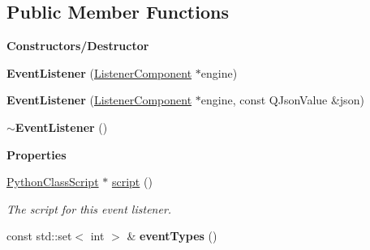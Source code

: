 \subsection*{Public Member Functions}
\begin{Indent}\textbf{ Constructors/\+Destructor}\par
\begin{DoxyCompactItemize}
\item 
\mbox{\label{classrev_1_1_event_listener_a8f026331faa8d20abad8afb712e62879}} 
{\bfseries Event\+Listener} (\mbox{\hyperlink{classrev_1_1_listener_component}{Listener\+Component}} $\ast$engine)
\item 
\mbox{\label{classrev_1_1_event_listener_ad98d4d0b094eeb0f6d3ff5ec29ba0b31}} 
{\bfseries Event\+Listener} (\mbox{\hyperlink{classrev_1_1_listener_component}{Listener\+Component}} $\ast$engine, const Q\+Json\+Value \&json)
\item 
\mbox{\label{classrev_1_1_event_listener_ac8989cbb9ff5161b486b01680c0b71f6}} 
{\bfseries $\sim$\+Event\+Listener} ()
\end{DoxyCompactItemize}
\end{Indent}
\begin{Indent}\textbf{ Properties}\par
\begin{DoxyCompactItemize}
\item 
\mbox{\label{classrev_1_1_event_listener_a0dba0d1ed7453aafdb66896a9a7e1634}} 
\mbox{\hyperlink{classrev_1_1_python_class_script}{Python\+Class\+Script}} $\ast$ \mbox{\hyperlink{classrev_1_1_event_listener_a0dba0d1ed7453aafdb66896a9a7e1634}{script}} ()
\begin{DoxyCompactList}\small\item\em The script for this event listener. \end{DoxyCompactList}\item 
\mbox{\label{classrev_1_1_event_listener_aa550f06e0fd69ee5f9ee2dda0c3ac609}} 
const std\+::set$<$ int $>$ \& {\bfseries event\+Types} ()
\end{DoxyCompactItemize}
\end{Indent}
